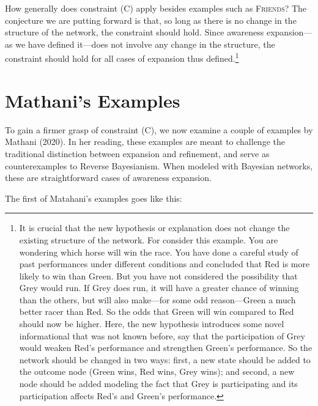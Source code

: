 \documentclass[
  11pt,
  dvipsnames,enabledeprecatedfontcommands]{scrartcl}
\begin{document}
How generally does constraint (C) apply besides examples such as
\textsc{Friends}? The conjecture we are putting forward is that, so long
as there is no change in the structure of the network, the constraint
should hold. Since awareness expansion---as we have defined it---does
not involve any change in the structure, the constraint should hold for
all cases of expansion thus defined.\footnote{It is crucial that the new
  hypothesis or explanation does not change the existing structure of
  the network. For consider this example. You are wondering which horse
  will win the race. You have done a careful study of past performances
  under different conditions and concluded that Red is more likely to
  win than Green. But you have not considered the possibility that Grey
  would run. If Grey does run, it will have a greater chance of winning
  than the others, but will also make---for some odd reason---Green a
  much better racer than Red. So the odds that Green will win compared
  to Red should now be higher. Here, the new hypothesis introduces some
  novel informational that was not known before, say that the
  participation of Grey would weaken Red's performance and strengthen
  Green's performance. So the network should be changed in two ways:
  first, a new state should be added to the outcome node (Green wins,
  Red wins, Grey wins); and second, a new node should be added modeling
  the fact that Grey is participating and its participation affects
  Red's and Green's performance.}

\hypertarget{mathanis-examples}{%
\section{Mathani's Examples}\label{mathanis-examples}}

To gain a firmer grasp of constraint (C), we now examine a couple of
examples by Mathani (2020). In her reading, these examples are meant to
challenge the traditional distinction between expansion and refinement,
and serve as counterexamples to Reverse Bayesianism. When modeled with
Bayesian networks, these are straightforward cases of awareness
expansion.

The first of Matahani's examples goes like this:
\end{document}
